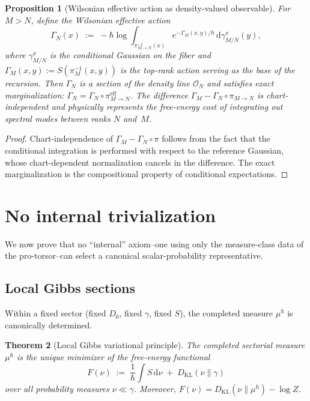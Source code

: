 \documentclass[12pt,a4paper]{article}
\theoremstyle{plain}
\newtheorem{theorem}{Theorem}[section]
\newtheorem{proposition}[theorem]{Proposition}
\theoremstyle{definition}
\theoremstyle{remark}
\newcommand{\dd}{\mathrm{d}}
\newcommand{\cO}{\mathcal{O}}
\newcommand{\DKL}{D_{\mathrm{KL}}}
\begin{document}
\begin{proposition}[Wilsonian effective action as density-valued
observable]
\label{prop:wilsonian}
For $M > N$, define the Wilsonian effective action
\begin{equation}\label{eq:wilsonian}
  \Gamma_N(x) \;:=\; -\hbar\log
  \int_{\pi_{M\to N}^{-1}(x)} e^{-\Gamma_M(x,y)/\hbar}\,
  \dd\gamma_{M/N}^x(y),
\end{equation}
where $\gamma_{M/N}^x$ is the conditional Gaussian on the fiber and
$\Gamma_M(x,y) := S(\pi_M^{-1}(x,y))$ is the top-rank
action serving as the base of the recursion.
Then $\Gamma_N$ is a section of the density line $\cO_N$ and
satisfies exact marginalization:
$\Gamma_N = \Gamma_N \circ \pi_{M\to N}^{\mathrm{eff}}$.
The difference $\Gamma_M - \Gamma_N \circ \pi_{M\to N}$ is
chart-independent and physically represents the free-energy cost of
integrating out spectral modes between ranks $N$ and~$M$.
\end{proposition}

\begin{proof}
Chart-independence of $\Gamma_M - \Gamma_N\circ\pi$ follows from the
fact that the conditional integration is performed with respect to
the reference Gaussian, whose chart-dependent normalization cancels
in the difference.  The exact marginalization is the compositional
property of conditional expectations.
\end{proof}


\section{No internal trivialization}
\label{sec:no-go}

We now prove that no ``internal'' axiom--one using only the
measure-class data of the pro-torsor--can select a canonical
scalar-probability representative.

\subsection{Local Gibbs sections}

Within a fixed sector (fixed $D_0$, fixed $\gamma$, fixed $S$), the
completed measure $\mu^\hbar$ is canonically determined.

\begin{theorem}[Local Gibbs variational principle]
\label{thm:gibbs}
The completed sectorial measure $\mu^\hbar$ is the unique minimizer of
the free-energy functional
\begin{equation}
  F(\nu) \;:=\; \frac{1}{\hbar}\int S\,\dd\nu
  \;+\; \DKL(\nu\|\gamma)
\end{equation}
over all probability measures $\nu \ll \gamma$.
Moreover, $F(\nu) = \DKL(\nu\|\mu^\hbar) - \log Z$.
\end{theorem}
\end{document}
